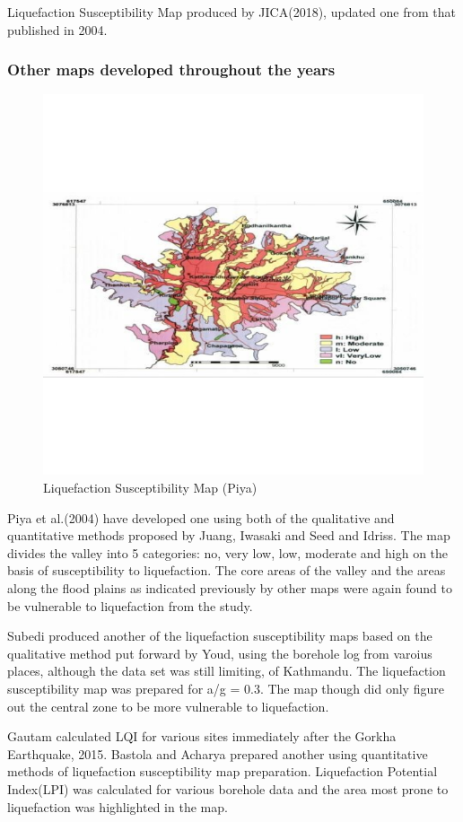 Liquefaction Susceptibility Map produced by JICA(2018), updated one from that published in 2004.

\subsubsection{Other maps developed throughout the years}

\begin{figure}[!hbt]
\centering
\includegraphics[width=0.5\linewidth,keepaspectratio]{images/main/piya.png}
\caption{ Liquefaction Susceptibility Map (Piya)}
\end{figure}

Piya et al.(2004) have developed one using both of the qualitative and quantitative methods proposed by Juang\cite{r25}, Iwasaki\cite{r26} and Seed and Idriss\cite{r12}. The map divides the valley into 5 categories: no, very low, low, moderate and high on the basis of susceptibility to liquefaction. The core areas of the valley and the areas along the flood plains as indicated previously by other maps were again found to be vulnerable to liquefaction from the study.

Subedi\cite{r28} produced another of the liquefaction susceptibility maps based on the qualitative method put forward by Youd\cite{r27}, using the borehole log from varoius places, although the data set was still limiting, of Kathmandu. The liquefaction susceptibility map was prepared for a/g = 0.3. The map though did only figure out the central zone to be more vulnerable to liquefaction. 

Gautam\cite{r30} calculated LQI for various sites immediately after the Gorkha Earthquake, 2015. Bastola and Acharya\cite{r31} prepared another using quantitative methods of  liquefaction susceptibility map preparation. Liquefaction Potential Index(LPI) was calculated for various borehole data and the area most prone to liquefaction was highlighted in the map. 

